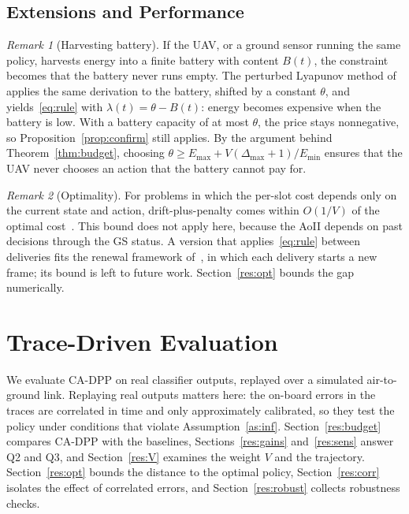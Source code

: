 \documentclass[5p,twocolumn]{elsarticle}
\theoremstyle{remark}
\newtheorem{remark}{Remark}
\begin{document}
\subsection{Extensions and Performance}
\begin{remark}[Harvesting battery]\label{rem:harvest}
If the UAV, or a ground sensor running the same policy, harvests energy into a finite battery with content $B(t)$, the constraint becomes that the battery never runs empty. The perturbed Lyapunov method of~\cite{huang2013eh} applies the same derivation to the battery, shifted by a constant $\theta$, and yields~\eqref{eq:rule} with $\lambda(t)=\theta-B(t)$: energy becomes expensive when the battery is low. With a battery capacity of at most $\theta$, the price stays nonnegative, so Proposition~\ref{prop:confirm} still applies. By the argument behind Theorem~\ref{thm:budget}, choosing $\theta\ge E_{\max}+V(\Delta_{\max}+1)/E_{\min}$ ensures that the UAV never chooses an action that the battery cannot pay for.
\end{remark}

\begin{remark}[Optimality]\label{rem:opt}
For problems in which the per-slot cost depends only on the current state and action, drift-plus-penalty comes within $O(1/V)$ of the optimal cost~\cite{neely2010book}. This bound does not apply here, because the AoII depends on past decisions through the GS status. A version that applies~\eqref{eq:rule} between deliveries fits the renewal framework of~\cite{neely2013renewal}, in which each delivery starts a new frame; its bound is left to future work. Section~\ref{res:opt} bounds the gap numerically.
\end{remark}
\section{Trace-Driven Evaluation}\label{sec:results}
We evaluate CA-DPP on real classifier outputs, replayed over a simulated air-to-ground link. Replaying real outputs matters here: the on-board errors in the traces are correlated in time and only approximately calibrated, so they test the policy under conditions that violate Assumption~\ref{as:inf}. Section~\ref{res:budget} compares CA-DPP with the baselines, Sections~\ref{res:gains} and~\ref{res:sens} answer Q2 and Q3, and Section~\ref{res:V} examines the weight $V$ and the trajectory. Section~\ref{res:opt} bounds the distance to the optimal policy, Section~\ref{res:corr} isolates the effect of correlated errors, and Section~\ref{res:robust} collects robustness checks.
\end{document}
